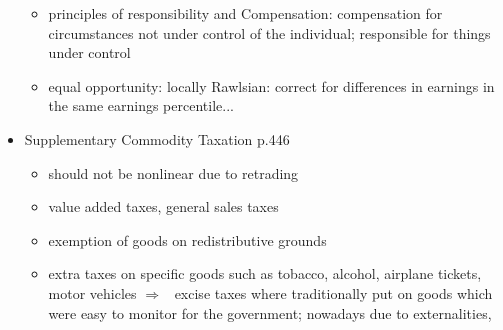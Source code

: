 \documentclass[12pt]{article}
\newcommand{\ar}{$\Rightarrow$ \ }
\begin{document}
\begin{itemize}
\begin{itemize}
\item principles of responsibility and Compensation: compensation for circumstances not under control of the individual; responsible for things under control
\item equal opportunity: locally Rawlsian: correct for differences in earnings in the same earnings percentile...
\end{itemize}
\item Supplementary Commodity Taxation p.446
\begin{itemize}
	\item should not be nonlinear due to retrading
	\item value added taxes, general sales taxes
	\item exemption of goods on redistributive grounds
	\item extra taxes on specific goods such as tobacco, alcohol, airplane tickets, motor vehicles \ar excise taxes where traditionally put on goods which were easy to monitor for the government; nowadays due to externalities, 
\end{itemize}
\end{itemize}
\end{document}
